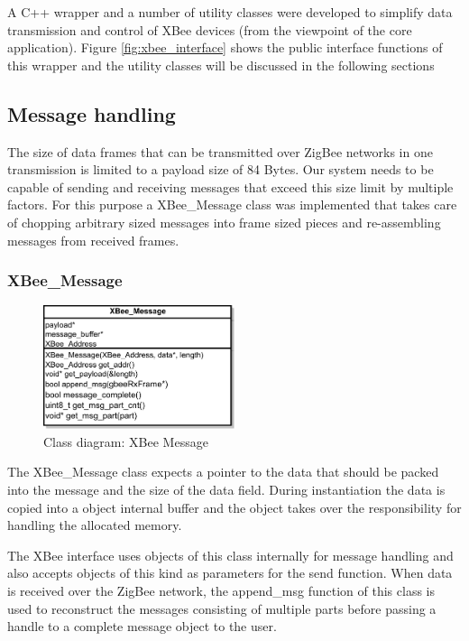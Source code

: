 A C++ wrapper and a number of utility classes were developed to simplify data transmission and control of XBee devices (from the viewpoint of the core application). Figure \ref{fig:xbee_interface} shows the public interface functions of this wrapper and the utility classes will be discussed in the following sections

\subsection{Message handling}
The size of data frames that can be transmitted over ZigBee networks in one transmission is limited to a payload size of 84 Bytes. Our system needs to be capable of sending and receiving messages that exceed this size limit by multiple factors. For this purpose a XBee\_Message class was implemented that takes care of chopping arbitrary sized messages into frame sized pieces and re-assembling messages from received frames. 

\subsubsection{XBee\_Message}
\begin{figure}
\centering
\includegraphics[width=0.5\textwidth]{Images/xbee_message}
\caption{Class diagram: XBee Message}
\label{fig:xbee_message}
\end{figure}

The XBee\_Message class expects a pointer to the data that should be packed into the message and the size of the data field. During instantiation the data is copied into a object internal buffer and the object takes over the responsibility for handling the allocated memory. 

The XBee interface uses objects of this class internally for message handling and also accepts objects of this kind as parameters for the send function. When data is received over the ZigBee network, the append\_msg function of this class is used to reconstruct the messages consisting of multiple parts before passing a handle to a complete message object to the user.

